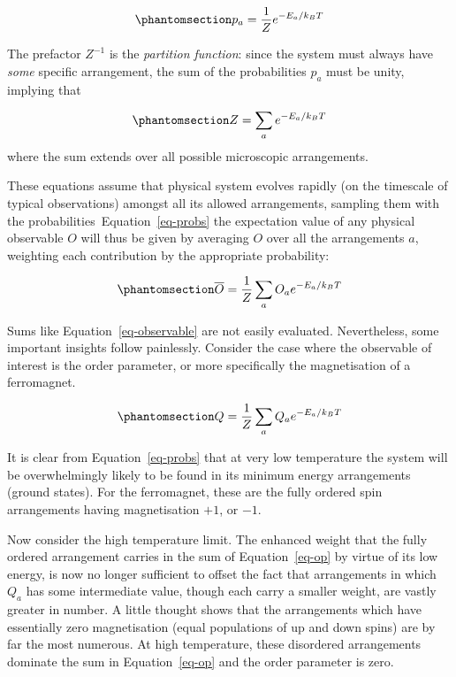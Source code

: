 \documentclass[
  letterpaper,
  enabledeprecatedfontcommands]{report}
\begin{document}
\begin{equation}\phantomsection\label{eq-probs}{
p_a=\frac{1}{Z}e^{-E_a/k_BT}
}\end{equation}

The prefactor \(Z^{-1}\) is the \emph{partition function}: since the
system must always have \emph{some} specific arrangement, the sum of the
probabilities \(p_a\) must be unity, implying that

\begin{equation}\phantomsection\label{eq-partition}{
Z=\sum_ae^{-E_a/k_BT}
}\end{equation} where the sum extends over all possible microscopic
arrangements.

These equations assume that physical system evolves rapidly (on the
timescale of typical observations) amongst all its allowed arrangements,
sampling them with the probabilities~Equation~\ref{eq-probs} the
expectation value of any physical observable \(O\) will thus be given by
averaging \(O\) over all the arrangements \(a\), weighting each
contribution by the appropriate probability:

\begin{equation}\phantomsection\label{eq-observable}{\overline {O}=\frac{1}{Z}\sum_a O_a e^{-E_a/k_BT}
}\end{equation}

Sums like Equation~\ref{eq-observable} are not easily evaluated.
Nevertheless, some important insights follow painlessly. Consider the
case where the observable of interest is the order parameter, or more
specifically the magnetisation of a ferromagnet.

\begin{equation}\phantomsection\label{eq-op}{
Q=\frac{1}{Z}\sum_a Q_a e^{-E_a/k_BT}
}\end{equation}

It is clear from Equation~\ref{eq-probs} that at very low temperature
the system will be overwhelmingly likely to be found in its minimum
energy arrangements (ground states). For the ferromagnet, these are the
fully ordered spin arrangements having magnetisation \(+1\), or \(-1\).

Now consider the high temperature limit. The enhanced weight that the
fully ordered arrangement carries in the sum of Equation~\ref{eq-op} by
virtue of its low energy, is now no longer sufficient to offset the fact
that arrangements in which \(Q_a\) has some intermediate value, though
each carry a smaller weight, are vastly greater in number. A little
thought shows that the arrangements which have essentially zero
magnetisation (equal populations of up and down spins) are by far the
most numerous. At high temperature, these disordered arrangements
dominate the sum in Equation~\ref{eq-op} and the order parameter is
zero.
\end{document}
